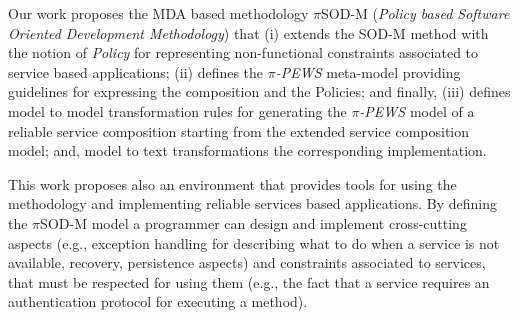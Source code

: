 Our work proposes the MDA based methodology $\pi$SOD-M
(\textit{Policy based Software Oriented Development Methodology}) that
(i) extends the SOD-M \cite{decastro1} method with the notion of {\em Policy}
\cite{Espinosa-Oviedo2011a} for representing non-functional constraints associated to service based applications; (ii)
defines the \textit{$\pi$-PEWS}  meta-model \cite{Placido2010LTPD} providing
guidelines for expressing the composition and the Policies; and finally,
 (iii) defines model to model transformation rules for generating the
 \textit{$\pi$-PEWS} model of a reliable service composition starting from the
 extended service composition model; and, model to text transformations  the corresponding implementation.

 
 This work proposes also an environment that provides tools for using the
 methodology and implementing reliable services based applications. By defining
 the $\pi$SOD-M model a programmer can design and implement cross-cutting aspects
 (e.g., exception handling for describing what to do when a service is not
 available, recovery, persistence aspects) and constraints associated to
 services, that must be respected for using them (e.g., the fact that a service
 requires an authentication protocol for executing a method).

